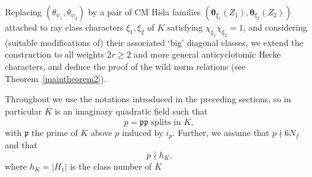 \documentclass[10pt,letterpaper]{amsart}
\theoremstyle{plain}
\theoremstyle{definition}
\theoremstyle{definition}
\theoremstyle{plain}
\theoremstyle{plain}
\theoremstyle{plain}
\theoremstyle{remark}
\numberwithin{equation}{section}
\newcommand{\pp}{\mathfrak{p}}
\newcommand{\ppbar}{\bar{\mathfrak{p}}}
\newcommand{\fkf}{\mathfrak{f}}
\newcommand{\Q}{\mathbf{Q}}
\begin{document}
Replacing $(\theta_{\psi_1},\theta_{\psi_2})$ by a pair of CM Hida families $(\boldsymbol{\theta}_{\xi_1}(Z_1),\boldsymbol{\theta}_{\xi_2}(Z_2))$ attached to ray class characters $\xi_1,\xi_2$ of $K$ satisfying $\chi_{\xi_1}\chi_{\xi_2}=1$, and considering (suitable modifications of) their associated `big' diagonal classes, we extend the construction %
to all weights $2r\geq 2$ and more general anticyclotomic Hecke characters, and deduce the proof of the wild norm relations (see Theorem~\ref{maintheorem2}).

Throughout we use the notations introduced in the preceding sections, so in particular $K$ is an imaginary quadratic field such that
\begin{equation}
\textrm{$p=\pp\ppbar$ splits in $K$},\tag{spl}
\end{equation}
with $\pp$ the prime of $K$ above $p$ induced by $i_p$. Further, we assume that $p\nmid 6N_f$ and that
\begin{equation}\label{eq:p-nmid-h}
\textrm{$p\nmid h_K$,}\tag{cn}
\end{equation}
where $h_K=\vert H_1\vert$ is the class number of $K$



\end{document}

